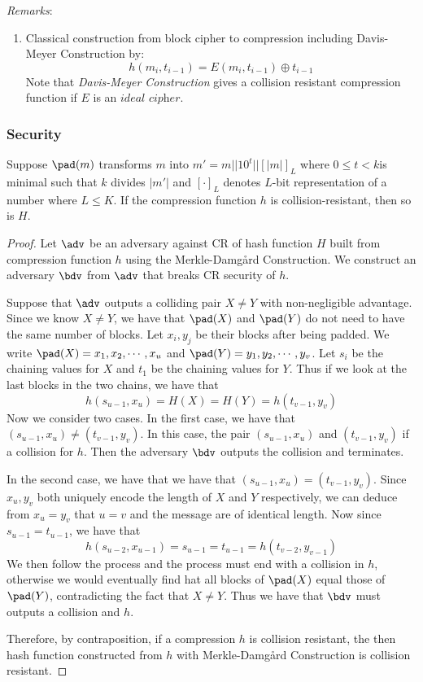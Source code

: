 \documentclass[11pt,a4paper]{article}
\begin{document}
\textit{Remarks}: 
\begin{enumerate}
\item Classical construction from block cipher to compression including Davis-Meyer Construction by: 
$$
h(m_i, t_{i-1}) = E(m_i, t_{i-1}) \oplus t_{i-1}
$$
Note that \textit{Davis-Meyer Construction} gives a collision resistant compression function if $E$ is an $\textit{ideal cipher}$. 
\end{enumerate}


\subsubsection{Security}
Suppose $\pad(m)$ transforms $m$ into $m' = m || 10^t || [|m|]_L$ where $0 \leq t < k$is minimal such that $k$ divides $|m'|$ and $[\cdot]_L$ denotes $L$-bit representation of a number where $L \leq K$. If the compression function $h$ is collision-resistant, then so is $H$. 
\begin{proof}
Let $\adv$ be an adversary against CR of hash function $H$ built from compression function $h$ using the Merkle-Damgård Construction. We construct an adversary $\bdv$ from $\adv$ that breaks CR security of $h$. 

Suppose that $\adv$ outputs a colliding pair $X \neq Y$ with non-negligible advantage. Since we know $X \neq Y$, we have that $\pad(X)$ and  $\pad(Y)$ do not need to have the same number of blocks. Let $x_i, y_j$ be their blocks after being padded. We write $\pad(X) = x_1,x_2, \cdots, x_u$ and $\pad(Y) = y_1, y_2, \cdots, y_v$. Let $s_i$ be the chaining values for $X$ and $t_1$ be the chaining values for $Y$. Thus if we look at the last blocks in the two chains, we have that 
$$
h(s_{u-1}, x_u) = H(X) = H(Y) = h(t_{v-1}, y_v) 
$$
Now we consider two cases. In the first case, we have that $(s_{u-1}, x_u) \neq (t_{v-1}, y_v)$. In this case, the pair $(s_{u-1}, x_u)$ and $(t_{v-1}, y_v)$ if a collision for $h$. Then the adversary $\bdv$ outputs the collision and terminates. 

In the second case, we have that we have that $(s_{u-1}, x_u) = (t_{v-1}, y_v)$. Since $x_u, y_v$ both uniquely encode the length of $X$ and $Y$ respectively, we can deduce from $x_u = y_v$ that $u=v$ and the message are of identical length. Now since $s_{u-1} = t_{u-1}$, we have that 
$$
h(s_{u-2}, x_{u-1}) = s_{u-1} = t_{u-1} = h(t_{v-2}, y_{v-1}) 
$$
We then follow the process and the process must end with a collision in $h$, otherwise we would eventually find hat all blocks of $\pad(X)$ equal those of $\pad(Y)$, contradicting the fact that $X \neq Y$. Thus we have that $\bdv$ must outputs a collision and $h$. 

Therefore, by contraposition, if a compression $h$ is collision resistant, the then hash function constructed from $h$ with Merkle-Damgård Construction is collision resistant. 
\end{proof}
\end{document}
